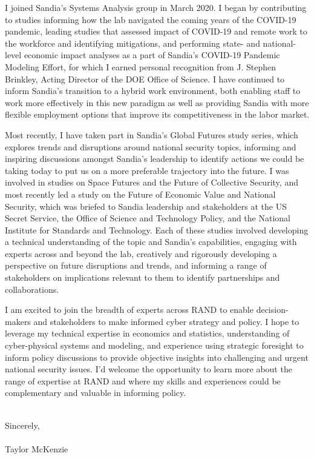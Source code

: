 \documentclass[10pt]{article}
\begin{document}
I joined Sandia's Systems Analysis group in March 2020. I began by contributing to studies informing how the lab navigated the coming years of the COVID-19 pandemic, leading studies that assessed impact of COVID-19 and remote work to the workforce and identifying mitigations, and performing state- and national-level economic impact analyses as a part of Sandia's COVID-19 Pandemic Modeling Effort, for which I earned personal recognition from J. Stephen Brinkley, Acting Director of the DOE Office of Science. I have continued to inform Sandia's transition to a hybrid work environment, both enabling staff to work more effectively in this new paradigm as well as providing Sandia with more flexible employment options that improve its competitiveness in the labor market.

Most recently, I have taken part in Sandia's Global Futures study series, which explores trends and disruptions around national security topics, informing and inspiring discussions amongst Sandia's leadership to identify actions we could be taking today to put us on a more preferable trajectory into the future. I was involved in studies on Space Futures and the Future of Collective Security, and most recently led a study on the Future of Economic Value and National Security, which was briefed to Sandia leadership and stakeholders at the US Secret Service, the Office of Science and Technology Policy, and the National Institute for Standards and Technology. Each of these studies involved developing a technical understanding of the topic and Sandia's capabilities, engaging with experts across and beyond the lab, creatively and rigorously developing a perspective on future disruptions and trends, and informing a range of stakeholders on implications relevant to them to identify partnerships and collaborations.

I am excited to join the breadth of experts across RAND to enable decision-makers and stakeholders to make informed cyber strategy and policy. I hope to leverage my technical expertise in economics and statistics, understanding of cyber-physical systems and modeling, and experience using strategic foresight to inform policy discussions to provide objective insights into challenging and urgent national security issues. I'd welcome the opportunity to learn more about the range of expertise at RAND and where my skills and experiences could be complementary and valuable in informing policy.

\noindent \\Sincerely,\\\\
Taylor McKenzie
\end{document}
